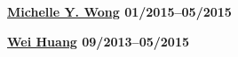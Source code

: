 \vspace{2pt}
\begin{minipage}{\linewidth}
	{\bfseries{\href{http://miwong.me/}{Michelle Y. Wong} \hfill 01/2015--05/2015}}
	\vspace{4pt}
\end{minipage}
\begin{minipage}{\linewidth}
	{\bfseries{\href{http://www.weihuang.info/index.html}{Wei Huang} \hfill 09/2013--05/2015}}
	\vspace{2pt}
\end{minipage}